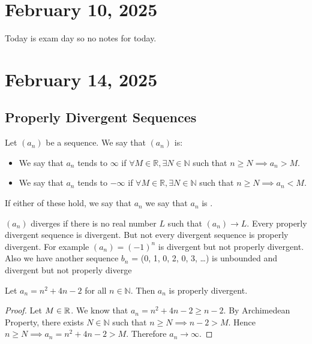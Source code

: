 \documentclass[11pt]{article}
\begin{document}
\section{February 10, 2025}
Today is exam day so no notes for today.
\section{February 14, 2025}
\subsection{Properly Divergent Sequences}
\begin{definition}
	Let \((a_n)\) be a sequence. We say that \((a_n)\) is:
	\begin{itemize}
		\item We say that \(a_n\) tends to \(\infty\) if \(\forall M \in \mathbb{R}, \exists N \in \mathbb{N}\) such that \(n \geq N \implies a_n > M\).
		\item We say that \(a_n\) tends to \(-\infty\) if \(\forall M \in \mathbb{R}, \exists N \in \mathbb{N}\) such that \(n \geq N \implies a_n < M\).
	\end{itemize}
	If either of these hold, we say that \(a_n\) we say that \(a_n\) is .
\end{definition}
\begin{fact}
	\((a_n)\) diverges if there is no real number \(L\) such that \((a_n) \to L\). Every properly divergent sequence is divergent. But not every divergent sequence is properly divergent. For example \((a_n) = {(-1)}^n\) is divergent but not properly divergent. Also we have another sequence \(b_n\) = (0, 1, 0, 2, 0, 3, \ldots ) is unbounded and divergent but not properly diverge
\end{fact}
\begin{example}
	Let \(a_n = n^2 + 4n - 2\) for all \(n \in \mathbb{N}\). Then \(a_n\) is properly divergent.
\end{example}
\begin{proof}
	Let \(M \in \mathbb R\). We know that \(a_n = n^2 + 4n  -2 \geq n -2\). By Archimedean Property, there exists \(N \in \mathbb{N}\) such that \(n \geq N \implies n - 2 > M\). Hence \(n \geq N \implies a_n = n^2 + 4n - 2 > M\). Therefore \(a_n \to \infty\).
\end{proof}
\end{document}
